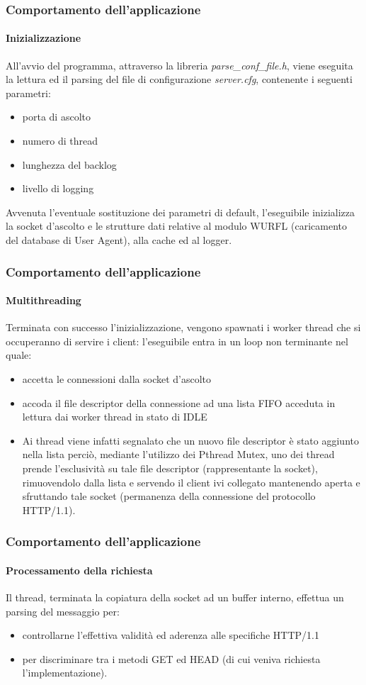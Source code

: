 \documentclass{beamer}
\begin{document}
\begin{frame}
\frametitle{Comportamento dell'applicazione}
\framesubtitle{Inizializzazione}

All'avvio del programma, attraverso la libreria \textit{parse\_conf\_file.h}, viene eseguita
la lettura ed il parsing del file di configurazione \textit{server.cfg}, contenente i seguenti parametri:

\begin{itemize}
\item porta di ascolto
\item numero di thread
\item lunghezza del backlog
\item livello di logging
\end{itemize}


Avvenuta l’eventuale sostituzione dei
parametri di default, l’eseguibile inizializza la socket d’ascolto e le strutture dati
relative al modulo WURFL (caricamento del database di User Agent), alla cache
ed al logger.

\end{frame}


\begin{frame}
\frametitle{Comportamento dell'applicazione}
\framesubtitle{Multithreading}

Terminata con successo l’inizializzazione, vengono spawnati i worker thread che
si occuperanno di servire i client: l’eseguibile entra in un loop non terminante nel
quale:

\begin{itemize}
\item accetta le connessioni dalla socket d’ascolto
\item accoda il file descriptor
della connessione ad una lista FIFO acceduta in lettura dai worker thread in stato
di IDLE
\item Ai thread viene infatti segnalato che un nuovo file descriptor è stato
aggiunto nella lista perciò, mediante l’utilizzo dei Pthread Mutex, uno dei thread
prende l’esclusività su tale file descriptor (rappresentante la socket),
rimuovendolo dalla lista e servendo il client ivi collegato mantenendo aperta e
sfruttando tale socket (permanenza della connessione del protocollo HTTP/1.1).
\end{itemize}

\end{frame}


\begin{frame}
\frametitle{Comportamento dell'applicazione}
\framesubtitle{Processamento della richiesta}

Il thread, terminata la copiatura della socket ad un buffer interno, effettua un
parsing del messaggio per:

\begin{itemize}
\item controllarne l’effettiva validità ed aderenza alle
specifiche HTTP/1.1

\item per discriminare tra i metodi GET ed HEAD (di cui
veniva richiesta l’implementazione).
\end{itemize}

\end{frame}
\end{document}
